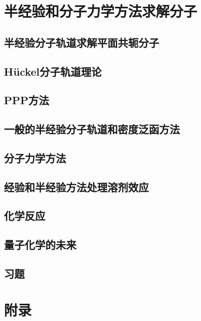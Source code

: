 \documentclass{book}
\begin{document}
	\chapter{半经验和分子力学方法求解分子}
	\section{半经验分子轨道求解平面共轭分子}
	
	\section{Hückel分子轨道理论}
	
	\section{PPP方法}
	
	\section{一般的半经验分子轨道和密度泛函方法}
	
	\section{分子力学方法}
	
	\section{经验和半经验方法处理溶剂效应}
	
	\section{化学反应}
	
	\section{量子化学的未来}
	
	\section*{习题}
	
	
	
	
	
	
	\appendix
	\chapter*{附录}
\end{document}
